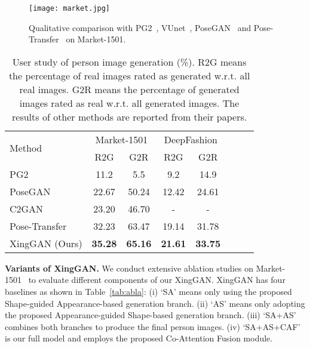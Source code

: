 \documentclass[runningheads]{llncs}
\begin{document}
\begin{figure}[!t]
	\centering
	\texttt{[image: market.jpg]}
	\caption{Qualitative comparison with PG2~\cite{ma2017pose}, VUnet~\cite{esser2018variational}, PoseGAN~\cite{siarohin2018deformable} and Pose-Transfer~\cite{zhu2019progressive} on Market-1501.}
	\label{fig:market_result}
\end{figure}

\begin{table}[!t]
	\centering
	\caption{User study of person image generation (\%). R2G means the percentage of real images rated as generated w.r.t. all real images. G2R means the percentage of generated images rated as real w.r.t. all generated images. The results of other methods are reported from their papers.}
		\begin{tabular}{lccccccc} \toprule
			\multirow{2}{*}{Method}  & \multicolumn{2}{c}{Market-1501} & \multicolumn{2}{c}{DeepFashion} \\ \cmidrule(lr){2-3} \cmidrule(lr){4-5} 
			& R2G & G2R & R2G & G2R    \\ \hline	
			PG2~\cite{ma2017pose}                              & 11.2  & 5.5    & 9.2   & 14.9 \\
			PoseGAN~\cite{siarohin2018deformable}    & 22.67 & 50.24  & 12.42 & 24.61 \\ 
			C2GAN~\cite{tang2019cycle}                      & 23.20 & 46.70  & -     & -     \\
			Pose-Transfer~\cite{zhu2019progressive}   & 32.23 & 63.47  & 19.14 & 31.78 \\  
			XingGAN (Ours)                                         & \textbf{35.28} & \textbf{65.16} & \textbf{21.61} & \textbf{33.75} \\	
			\bottomrule	
	\end{tabular}
	\label{tab:pose_ruser}
\end{table}


\noindent \textbf{Variants of XingGAN.}
We conduct extensive ablation studies on Market-1501~\cite{zheng2015scalable} to evaluate different components of our XingGAN.
XingGAN has four baselines as shown in Table~\ref{tab:abla}: (i) `SA' means only using the proposed Shape-guided Appearance-based generation branch. (ii) `AS' means only adopting the proposed Appearance-guided Shape-based generation branch. (iii) `SA+AS' combines both branches to produce the final person images. (iv) `SA+AS+CAF' is our full model and employs the proposed Co-Attention Fusion module.
\end{document}
